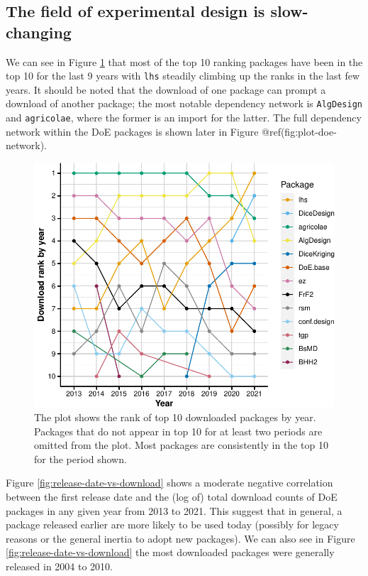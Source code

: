 \documentclass{article}
\begin{document}
\hypertarget{ranking}{%
\subsection{The field of experimental design is
slow-changing}\label{ranking}}

We can see in Figure \ref{fig:rank-over-time} that most of the top 10
ranking packages have been in the top 10 for the last 9 years with
\texttt{lhs} steadily climbing up the ranks in the last few years. It
should be noted that the download of one package can prompt a download
of another package; the most notable dependency network is
\texttt{AlgDesign} and \texttt{agricolae}, where the former is an import
for the latter. The full dependency network within the DoE packages is
shown later in Figure @ref(fig:plot-doe-network).

\begin{figure}[htbp]

{\centering \includegraphics{figures/rank-over-time-1} 

}

\caption{The plot shows the rank of top 10 downloaded packages by year. Packages that do not appear in top 10 for at least two periods are omitted from the plot. Most packages are consistently in the top 10 for the period shown.}\label{fig:rank-over-time}
\end{figure}

Figure \ref{fig:release-date-vs-download} shows a moderate negative
correlation between the first release date and the (log of) total
download counts of DoE packages in any given year from 2013 to 2021.
This suggest that in general, a package released earlier are more likely
to be used today (possibly for legacy reasons or the general inertia to
adopt new packages). We can also see in Figure
\ref{fig:release-date-vs-download} the most downloaded packages were
generally released in 2004 to 2010.
\end{document}
